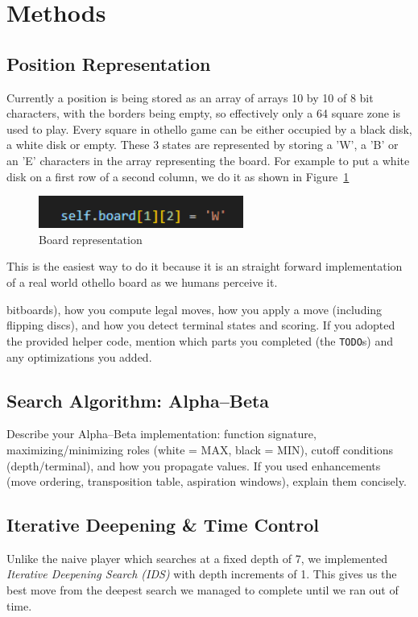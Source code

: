 \documentclass[10pt, titlepage, oneside, a4paper]{article}
\begin{document}
\section{Methods}
\label{sec:methods}


\subsection{Position Representation}
Currently a position is being stored as an array of arrays 10 by 10 of 8 bit characters, with the borders being empty, so effectively only a 64 square zone is used to play. 
Every square in othello game can be either occupied by a black disk, a white disk or empty. These 3 states are represented by storing a 'W', a 'B' or an 'E' characters in the array representing the board.
For example to put a white disk on a first row of a second column, we do it as shown in Figure~\ref{fig:board_representation}
\begin{figure}[h]
    \centering
    \includegraphics[width=0.6\textwidth]{img/board_representation}
    \caption{Board representation}
    \label{fig:board_representation}
\end{figure}
This is the easiest way to do it because it is an straight forward implementation of a real world othello board as we humans perceive it. 



 bitboards), how you compute legal moves, how you apply a move (including flipping discs), and how you detect terminal states and scoring.
If you adopted the provided helper code, mention which parts you completed (the \texttt{TODO}s) and any optimizations you added.

\subsection{Search Algorithm: Alpha--Beta}
Describe your Alpha--Beta implementation: function signature, maximizing/minimizing roles (white = MAX, black = MIN),
cutoff conditions (depth/terminal), and how you propagate values.
If you used enhancements (move ordering, transposition table, aspiration windows), explain them concisely.

\subsection{Iterative Deepening \& Time Control}
Unlike the naive player which searches at a fixed depth of 7, we implemented 
\textit{Iterative Deepening Search (IDS)} with depth increments of 1. 
This gives us the best move from the deepest search we managed to complete 
until we ran out of time.
\end{document}
